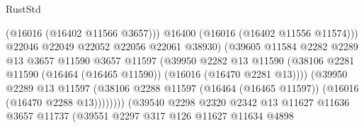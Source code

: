 \begin{lexlean}{RustStd}
\begin{coremodule}
                                              (@16016 (@16402 @11566 @3657)))
                                            @16400
                                            (@16016 (@16402 @11556 @11574)))
                                          @22046
                                          @22049
                                          @22052
                                          @22056
                                          @22061
                                          @38930)
                                        (@39605
                                          @11584
                                          @2282
                                          @2289
                                          @13
                                          @3657
                                          @11590
                                          @3657
                                          @11597
                                          (@39950
                                            @2282
                                            @13
                                            @11590
                                            (@38106
                                              @2281
                                              @11590
                                              (@16464 (@16465 @11590))
                                              (@16016 (@16470 @2281 @13))))
                                          (@39950
                                            @2289
                                            @13
                                            @11597
                                            (@38106
                                              @2288
                                              @11597
                                              (@16464 (@16465 @11597))
                                              (@16016 (@16470 @2288 @13))))))))
                                  (@39540
                                    @2298
                                    @2320
                                    @2342
                                    @13
                                    @11627
                                    @11636
                                    @3657
                                    @11737
                                    (@39551
                                      @2297
                                      @317
                                      @126
                                      @11627
                                      @11634
                                      @4898

\end{coremodule}
\end{lexlean}
